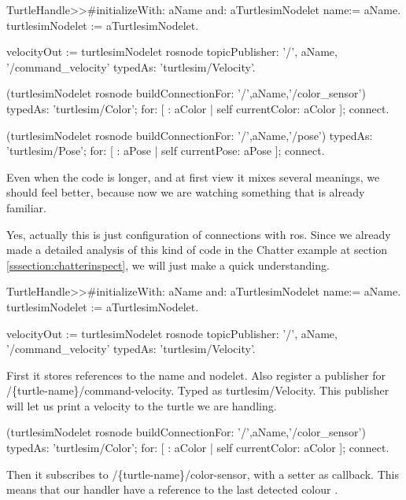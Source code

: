 \documentclass[a4paper,10pt,twoside]{book}
\begin{document}
			
			\begin{code}

TurtleHandle>>#initializeWith: aName and: aTurtlesimNodelet
	name:= aName.
	turtlesimNodelet := aTurtlesimNodelet.
	
	velocityOut := turtlesimNodelet rosnode topicPublisher: '/', aName, '/command_velocity' typedAs: 'turtlesim/Velocity'.
	
	(turtlesimNodelet rosnode buildConnectionFor: '/',aName,'/color_sensor') 
			typedAs: 'turtlesim/Color'; 
			for: [ : aColor | self currentColor: aColor ];
	 		connect.
			
	(turtlesimNodelet rosnode buildConnectionFor: '/',aName,'/pose') 
			typedAs: 'turtlesim/Pose'; 
			for: [ : aPose | self currentPose: aPose ];
			connect.
	
			\end{code}
			
			
			Even when the code is longer, and at first view it mixes several meanings, we should feel better, because now we are watching something that is already familiar. 
			
			Yes, actually this is just configuration of connections with ros. Since we already made a detailed analysis of this kind of code in the Chatter example at section \ref{sssection:chatterinspect}, we will just make a quick understanding.
			
				\begin{code}

TurtleHandle>>#initializeWith: aName and: aTurtlesimNodelet
	name:= aName.
	turtlesimNodelet := aTurtlesimNodelet.
	
	velocityOut := turtlesimNodelet rosnode topicPublisher: '/', aName, '/command_velocity' typedAs: 'turtlesim/Velocity'.
	
				\end{code}
				
					First it stores references to the name and nodelet. Also register a publisher for /\{turtle-name\}/command-velocity. Typed as turtlesim/Velocity. This publisher will let us print a velocity to the turtle we are handling. 
					
					
				\begin{code}
	(turtlesimNodelet rosnode buildConnectionFor: '/',aName,'/color_sensor') 
			typedAs: 'turtlesim/Color'; 
			for: [ : aColor | self currentColor: aColor ];
	 		connect.
				\end{code}
				
				
					Then it subscribes to  /\{turtle-name\}/color-sensor, with a setter as callback. This means that our handler have a reference to the last detected colour . 	
					
\end{document}
